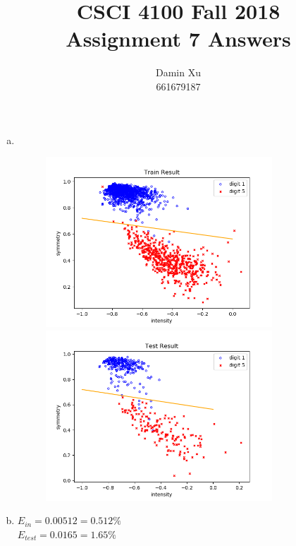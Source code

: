 \documentclass[11pt]{article}
\title{CSCI 4100 Fall 2018 \\
Assignment 7 Answers}
\author{Damin Xu\\661679187}
\begin{document}
\maketitle
\begin{enumerate} [(a)]
	\item \ \\
	\begin{figure}[htbp]
		\centering
		\begin{minipage}[t]{0.48\textwidth}
			\centering
			\includegraphics[width=8.5cm]{train_result.png}
		\end{minipage}
		\begin{minipage}[t]{0.48\textwidth}
			\centering
			\includegraphics[width=8.5cm]{test_result.png}
		\end{minipage}
	\end{figure}

	\item $E_{in} = 0.00512 = 0.512\%$\\$E_{test} = 0.0165=1.65\%$


\end{enumerate}
\end{document}

